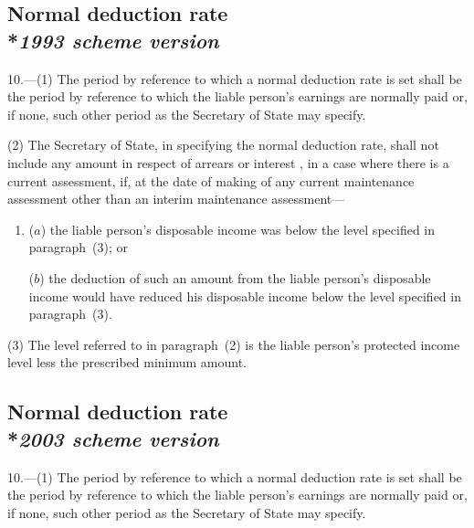 \documentclass[12pt,a4paper]{article}
\begin{document}
\subsection[10. Normal deduction rate --- \emph{1993 scheme version}]{Normal deduction rate\\*\emph{1993 scheme version}}

10.—(1) The period by reference to which 
a normal deduction rate  %
is set shall be the period by reference to which the liable person’s earnings are normally paid or, if none, such other period as the Secretary of State may specify.

(2) The Secretary of State, in specifying the normal deduction rate, shall not include any amount in respect of arrears or interest%
, in a case where there is a current assessment,  %
if, 
at the date of making of any current maintenance assessment other than an interim maintenance assessment---  %
\begin{enumerate}\item[]
($a$) the liable person’s disposable income was below the level specified in paragraph~(3); or

($b$) the deduction of such an amount from the liable person’s disposable income would have reduced his disposable income below the level specified in paragraph~(3).
\end{enumerate}

(3) The level referred to in paragraph~(2) is the liable person’s protected income level less the prescribed minimum amount.


\subsection[10. Normal deduction rate --- \emph{2003 scheme version}]{Normal deduction rate\\*\emph{2003 scheme version}}

10.—(1) The period by reference to which 
a normal deduction rate  %
is set shall be the period by reference to which the liable person’s earnings are normally paid or, if none, such other period as the Secretary of State may specify.
\end{document}
